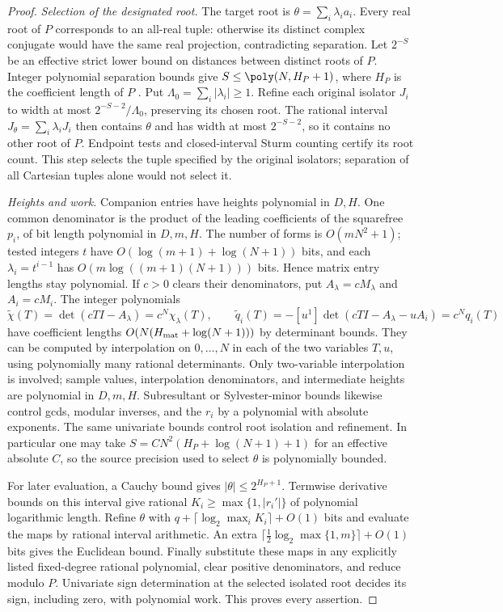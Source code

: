 \begin{proof}
\emph{Selection of the designated root.} The target root is
$\theta=\sum_i\lambda_i a_i$. Every real root of $P$ corresponds to an
all-real tuple: otherwise its distinct complex conjugate would have the same
real projection, contradicting separation. Let $2^{-S}$ be an effective
strict lower bound on distances between distinct roots of $P$. Integer
polynomial separation bounds give $S\le\poly(N,H_P+1)$, where $H_P$
is the coefficient length of $P$
\cite{basu2006-algorithms-in-real-algebraic-geometry}.
Put $\Lambda_0=\sum_i|\lambda_i|\ge1$. Refine each original isolator
$J_i$ to width at most $2^{-S-2}/\Lambda_0$, preserving its chosen root.
The rational interval $J_\theta=\sum_i\lambda_iJ_i$ then contains $\theta$
and has width at most $2^{-S-2}$, so it contains no other root of $P$.
Endpoint tests and closed-interval Sturm counting certify its root count.
This step selects the tuple specified by the original isolators; separation
of all Cartesian tuples alone would not select it.

\emph{Heights and work.} Companion entries have heights polynomial in
$D,H$. One common denominator is the product of the leading coefficients
of the squarefree $p_i$, of bit length polynomial in $D,m,H$. The number
of forms is $O(mN^2+1)$; tested integers $t$ have
$O(\log(m+1)+\log(N+1))$ bits, and each $\lambda_i=t^{i-1}$ has
$O(m\log((m+1)(N+1)))$ bits. Hence matrix entry lengths stay polynomial.
If $c>0$ clears their denominators, put $A_\lambda=cM_\lambda$ and
$A_i=cM_i$. The integer polynomials
\[
 \widetilde\chi(T)=\det(cTI-A_\lambda)=c^N\chi_\lambda(T),\qquad
 \widetilde q_i(T)=-[u^1]\det(cTI-A_\lambda-uA_i)=c^Nq_i(T)
\]
have coefficient lengths $O(N(H_{\rm mat}+\log(N+1)))$ by determinant
bounds. They can be computed by interpolation on $0,\dots,N$ in each of
the two variables $T,u$, using polynomially many rational determinants.
Only two-variable interpolation is involved; sample values, interpolation
denominators, and intermediate heights are polynomial in $D,m,H$.
Subresultant or Sylvester-minor bounds likewise control gcds, modular
inverses, and the $r_i$ by a polynomial with absolute exponents. The same
univariate bounds control root isolation and refinement. In particular one
may take $S=C N^2(H_P+\log(N+1)+1)$ for an effective absolute $C$, so the
source precision used to select $\theta$ is polynomially bounded.

For later evaluation, a Cauchy bound gives $|\theta|\le2^{H_P+1}$.
Termwise derivative bounds on this interval give rational
$K_i\ge\max\{1,|r_i'|\}$ of polynomial logarithmic length. Refine
$\theta$ with $q+\lceil\log_2\max_iK_i\rceil+O(1)$ bits and evaluate the
maps by rational interval arithmetic. An extra
$\lceil\tfrac12\log_2\max\{1,m\}\rceil+O(1)$ bits gives the Euclidean
bound. Finally substitute these maps in any explicitly listed fixed-degree
rational polynomial, clear positive denominators, and reduce modulo $P$.
Univariate sign determination at the selected isolated root decides its
sign, including zero, with polynomial work. This proves every assertion.
\end{proof}

